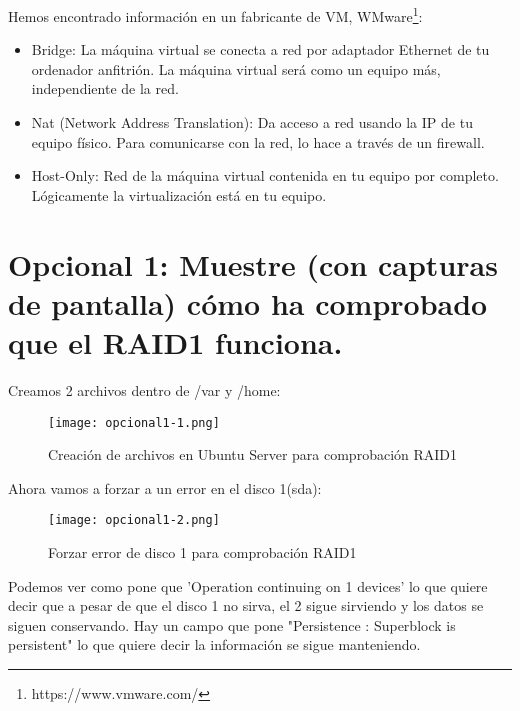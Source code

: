 	Hemos encontrado información en un fabricante de VM, 
	WMware\footnote{https://www.vmware.com/}:
	
	\begin{itemize}
		\item Bridge\cite{cincuenta}: La máquina virtual se conecta a red por adaptador Ethernet de tu ordenador anfitrión. La máquina virtual será como un equipo más, independiente de la red.
		\item Nat\cite{cincuentaydos} (Network Address Translation): Da acceso a red usando la IP de tu equipo físico. Para comunicarse con la red, lo hace a través de un firewall.
		\item Host-Only\cite{cincuentaytres}: Red de la máquina virtual contenida en tu equipo por completo. Lógicamente la virtualización está en tu equipo.
	\end{itemize}
	
	\section{Opcional 1: Muestre (con capturas de pantalla) cómo ha comprobado que el RAID1 funciona.}
	
	Creamos 2 archivos dentro de /var y /home:
	
	\begin{figure}[H]
		\centering
		\texttt{[image: opcional1-1.png]}  
		\label{figura26}
		
		\caption{Creación de archivos en Ubuntu Server para comprobación RAID1} 
	\end{figure}
	
	
	Ahora vamos a forzar a un error en el disco 1(sda):
	
	\begin{figure}[H]
		\centering
		\texttt{[image: opcional1-2.png]}  
		\label{figura27}
		
		\caption{Forzar error de disco 1 para comprobación RAID1} 
	\end{figure}
	
	Podemos ver como pone que 'Operation continuing on 1 devices' lo que quiere decir que a pesar de que el disco 1 no sirva, el 2 sigue sirviendo y los datos se siguen conservando. Hay un campo que pone "Persistence : Superblock is persistent" lo que quiere decir la información se sigue manteniendo.
	\\
	
